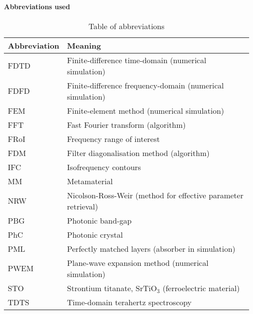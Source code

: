 \paragraph{Abbreviations used} %
\begin{table}[ht]   \caption{Table of abbreviations}  \label{tb_shortcuts} \centering 
\begin{tabular}{ll}
 \toprule
Abbreviation & Meaning	\\
 \hline
FDTD 		& Finite-difference time-domain (numerical simulation)\\
FDFD 		& Finite-difference frequency-domain (numerical simulation)\\
FEM 		& Finite-element method (numerical simulation)\\
FFT 		& Fast Fourier transform (algorithm)\\
FRoI 		& Frequency range of interest\\
FDM 		& Filter diagonalisation method (algorithm)\\
IFC			& Isofrequency contours\\
MM			& Metamaterial\\
NRW 		& Nicolson-Ross-Weir (method for effective parameter retrieval)\\
PBG			& Photonic band-gap\\
PhC 		& Photonic crystal\\
PML 		& Perfectly matched layers (absorber in simulation)\\
PWEM 		& Plane-wave expansion method (numerical simulation)\\
STO			& Strontium titanate, SrTiO$_3$ (ferroelectric material)\\
TDTS 		& Time-domain terahertz spectroscopy\\
 \bottomrule
 \end{tabular} \end{table}

